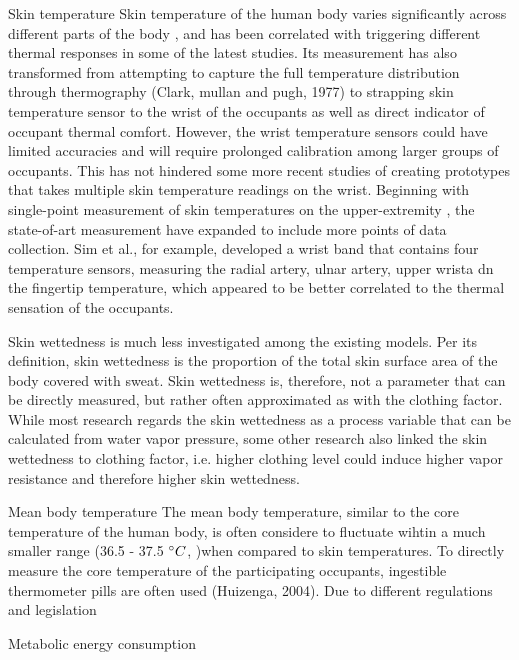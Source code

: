 	Skin temperature
	Skin temperature of the human body varies significantly across different parts of the body \cite{choi_cobi:_2010}, and has been correlated with triggering different thermal responses in some of the latest studies. Its measurement has also transformed from attempting to capture the full temperature distribution through thermography (Clark, mullan and pugh, 1977) to strapping skin temperature sensor to the wrist of the occupants \cite{choi_investigation_2017,liu_personal_2019} as well as direct indicator of occupant thermal comfort. However, the wrist temperature sensors could have limited accuracies \cite{mccarthy_validation_2016} and will require prolonged calibration among larger groups of occupants. This has not hindered some more recent studies of creating prototypes that takes multiple skin temperature readings on the wrist. Beginning with single-point measurement of skin temperatures on the upper-extremity \cite{wang_observations_2007}, the state-of-art measurement have expanded to include more points of data collection. Sim et al., for example, developed a wrist band that contains four temperature sensors, measuring the radial artery, ulnar artery, upper wrista dn the fingertip temperature, which appeared to be better correlated to the thermal sensation of the occupants.

	Skin wettedness is much less investigated among the existing models. Per its definition, skin wettedness is the proportion of the total skin surface area of the body covered with sweat. Skin wettedness is, therefore, not a parameter that can be directly measured, but rather often approximated as with the clothing factor\cite{mcintyre_subjective_1972}. While most research regards the skin wettedness as a process variable that can be calculated from water vapor pressure\cite{doherty_evaluation_1988}, some other research also linked the skin wettedness to clothing factor, i.e. higher clothing level could induce higher vapor resistance and therefore higher skin wettedness\cite{havenith_personal_2002}. 

	Mean body temperature
	The mean body temperature, similar to the core temperature of the human body, is often considere to fluctuate wihtin a much smaller range (36.5 - 37.5 $\degree C$, \cite{shapiro_environmental_1984})when compared to skin temperatures. To directly measure the core temperature of the participating occupants, ingestible thermometer pills are often used (Huizenga, 2004). Due to different regulations and legislation 

	Metabolic energy consumption

